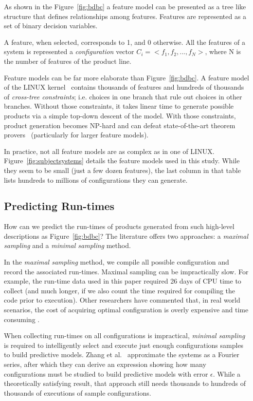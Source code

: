 \documentclass{sig-alternative}
\newcommand{\fig}[1]{Figure~\ref{fig:#1}}
\begin{document}
As shown in the Figure~\ref{fig:bdbc} a feature model can be presented as a tree like structure that defines relationships among features.   Features are represented as a set of binary decision variables. 

A feature, when selected, corresponds to 1, and 0 otherwise. All the features of a system is represented a {\em configuration} vector  $C_i= <f_1, f_2, ...,f_N>$, 
where N is the number of features of the product line.  
    
Feature models can be far more elaborate than \fig{bdbc}. 
A feature model of the LINUX kernel~\cite{sayyad13b} contains thousands of features and hundreds of thousands of  {\em cross-tree constraints}; i.e. choices in one branch that rule out choices in other branches. 
Without those constraints, it takes linear time to generate possible products via a simple
top-down descent of the model. With those constraints, product generation becomes NP-hard and can
 defeat state-of-the-art theorem provers~\cite{pohl11} (particularly for larger feature models).
 
 
 
In practice, not all feature models are as complex as in one of LINUX.
\fig{subjectsystems} details the feature models used in this study. While
they seem to be small (just a few dozen features), the last column in that table lists hundreds
to millions of configurations they can generate.


\subsection{Predicting Run-times}\label{sect:addit}
How can we predict the run-times of products generated from such high-level descriptions
as \fig{bdbc}? The literature offers two approaches: a {\em maximal sampling} and a {\em minimal sampling} method.

In the {\em maximal sampling} method, we compile all  possible configuration and record the associated run-times. Maximal sampling  can be impractically slow.
For example, the run-time data used in this paper required  26 days of CPU time to collect (and much longer, if we also count the time required
 for compiling the code prior to execution). 
 Other researchers have commented that,  in 
 real world scenarios, the cost of acquiring optimal configuration is overly expensive and time consuming \cite{weiss2008maximizing}.
 
 When collecting run-times on all configurations is impractical,  {\em minimal sampling } 
 is required to intelligently select and execute   just enough configurations samples to build
 predictive models.
 Zhang et al.~\cite{zhang2015performance} approximate the
 systems as a Fourier series, after which they can derive an expression showing how many configurations must be studied
 to build predictive models with error $\epsilon$. While a theoretically satisfying result, that approach still needs thousands to hundreds of thousands of executions of sample
 configurations.  
\end{document}
